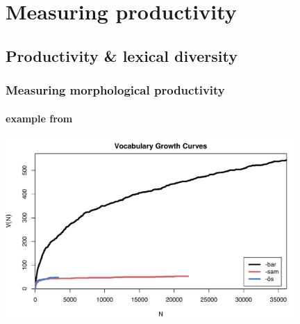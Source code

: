 \documentclass[t]{beamer} %
\begin{document}
\section{Measuring productivity}


\subsection{Productivity \& lexical diversity}

\begin{frame}
  \frametitle{Measuring morphological productivity}
  \framesubtitle{example from \citet{Evert:Luedeling:01}}
  
  \centering
  \includegraphics[width=11cm]{../plots/EL2001_vgc_bar_sam_oes}%
\end{frame}
\end{document}
